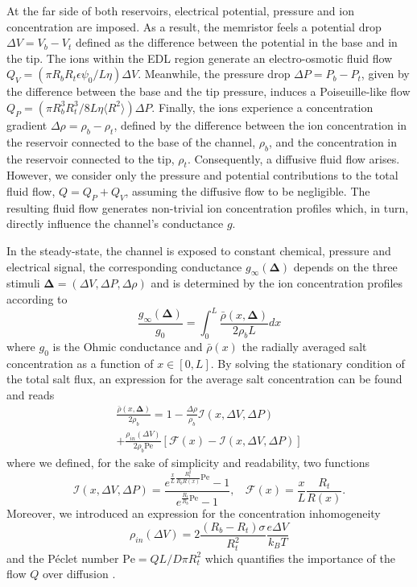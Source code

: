 \documentclass[reprint,superscriptaddress,prb,showkeys]{revtex4-2}
\newcommand{\brac}[1]{\left(#1 \right)} %
\begin{document}
At the far side of both reservoirs, electrical potential, pressure and ion concentration are imposed. As a result, the memristor feels a potential drop $\Delta V = V_b - V_t$ defined as the difference between the potential in the base and in the tip. The ions within the EDL region generate an electro-osmotic fluid flow $Q_V = (\pi R_b R_t\epsilon\psi_0/L\eta)\Delta V$. Meanwhile, the pressure drop $\Delta P = P_b - P_t$, given by the difference between the base and the tip pressure, induces a Poiseuille-like flow $Q_P = (\pi R_b^3 R_t^3/8L\eta\langle R^2\rangle)\Delta P$. Finally, the ions experience a concentration gradient $\Delta \rho = \rho_b - \rho_t$, defined by the difference between the ion concentration in the reservoir connected to the base of the channel, $\rho_b$, and the concentration in the reservoir connected to the tip, $\rho_t$. Consequently, a diffusive fluid flow arises. However, we consider only the pressure and potential contributions to the total fluid flow, $Q = Q_P + Q_V$, assuming the diffusive flow to be negligible.  The resulting fluid flow generates non-trivial ion concentration profiles which, in turn, directly influence the channel's conductance $g$. 

In the steady-state, the channel is exposed to constant chemical, pressure and electrical signal, the corresponding conductance $g_{\infty}\brac{\boldsymbol{\Delta}}$ depends on the three stimuli $\boldsymbol{\Delta}= (\Delta V, \Delta P, \Delta \rho)$ and is determined by the ion concentration profiles according to 
\[
\frac{g_{\infty}\brac{\boldsymbol{\Delta}}}{g_0} = \int_0^{L} \frac{\bar{\rho}\left(x, \boldsymbol{\Delta}\right)}{2\rho_b L} dx                                           
\]
where $g_0$ is the Ohmic conductance and $\bar{\rho}(x)$ the radially averaged salt concentration as a function of $x\in[0,L]$\cite{Rene_IonicNeuromorphic}. By solving the stationary condition of the total salt flux, an expression for the average salt concentration can be found and reads
\begin{multline}
\frac{\bar{\rho}\left(x, \boldsymbol{\Delta}\right)}{2\rho_b} = 1 - \frac{\Delta \rho}{\rho_b} \mathcal{I}\left(x, \Delta V, \Delta P\right) \\
 + \frac{ \rho_{in}\left( \Delta V \right) }{2\rho_b \text{Pe}} \left[ \mathcal{F}(x) - \mathcal{I}\left(x, \Delta V, \Delta P\right) \right]
\label{eq:rho_average}
\end{multline}
where we defined, for the sake of simplicity and readability, two functions
\[
\mathcal{I}\left(x, \Delta V, \Delta P\right) = \frac{e^{\frac{x}{L}\frac{R_t^2}{R_b R(x)} \text{Pe}}-1}{e^{\frac{R_t}{R_b} \text{Pe}}-1}, \ \ \ \ \mathcal{F}(x) = \frac{x}{L}\frac{R_t}{R(x)}.
\]
Moreover, we introduced an expression for the concentration inhomogeneity 
\[
\rho_{in}\brac{\Delta V} = 2\frac{(R_b-R_t)\sigma}{R_t^2}\frac{e\Delta V}{k_B T}
\]
and the Péclet number
$
\text{Pe} = QL/D\pi R_t^2
$
which quantifies the importance of the flow $Q$ over diffusion \cite{Rene_PressureSensitive}.
\end{document}

